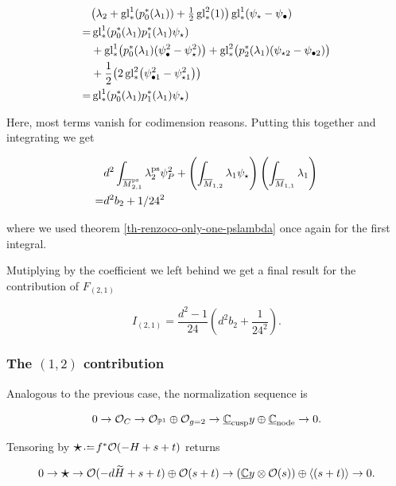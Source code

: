 \documentclass[12pt]{memoir}
\begin{document}
\begin{align*}
      & \bigl(\la_2+\glu^1_\ast(p_0^\ast(\la_1))+\tfrac{1}{2}\glu^2_\ast(1)\bigr)\glu_\ast^{1}(\psi_\star-\psi_\8)                                 \\
    = & \glu_\ast^{1}(p_0^\ast(\la_1)p_1^\ast(\la_1)\psi_\star)                                                                                    \\
      & +\glu_\ast^{1}\bigl(p_0^\ast(\la_1)(\psi_{\8}^2-\psi_{\star}^2)\bigr)+\glu_\ast^{2}\bigl(p_2^{\ast}(\la_1)(\psi_{\star2}-\psi_{\82})\bigr) \\
      & +\half\bigl(2\glu_\ast^2\bigl(\psi_{\81}^2-\psi_{\star1}^2\bigr)\bigr)                                                                     \\
    = & \glu_\ast^{1}(p_0^\ast(\la_1)p_1^\ast(\la_1)\psi_\star)
\end{align*}

Here, most terms vanish for codimension reasons. Putting this together and integrating we get

\begin{align*}
      & d^2\int_{\overline{M}^{\operatorname{\mathrm{ps}}}_{2,1}}\lambda_2^{\operatorname{\mathrm{ps}}}\psi_{P}^2+\left(\int_{\overline{M}_{1,2}}\lambda_1\psi_\star\right)\left(\int_{\overline{M}_{1,1}}\lambda_1\right) \\
    = & d^2b_2+1/24^2
\end{align*}

where we used theorem \ref{th-renzoco-only-one-pslambda} once again for the first integral.\par
Mutiplying by the coefficient we left behind we get a final result for the contribution of \(F_{(2,1)}\)

\[I_{(2,1)}=\frac{d^2-1}{24}\left(d^2b_2+\frac{1}{24^2}\right).\]


\subsubsection{The \((1,2)\) contribution}

Analogous to the previous case, the normalization sequence is


\[0\to\mathcal{O}_C\to \mathcal{O}_{\mathbb{P}^1}\oplus\mathcal{O}_{g=2}\to\underline{\mathbb{C}}_{\text{cusp}}y\oplus\underline{\mathbb{C}}_{\text{node}}\to 0.\]


Tensoring by \({\raisebox{-0.08em}{\scalebox{1.5}{\ensuremath\star}}}\defeq f^\ast\cO(-H+s+t)\) returns


\[
    0\to {\raisebox{-0.08em}{\scalebox{1.5}{\ensuremath\star}}}\to \cO(-d\widetilde{H}+s+t)\oplus\cO(s+t)\to(\un{\bC}y\ox\cO(s))\oplus\genr{(s+t)}\to 0.
\]
\end{document}
